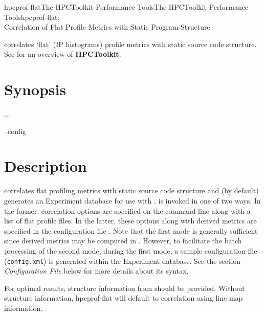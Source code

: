 \documentclass[english]{article}
\begin{document}
\begin{Name}{1}{hpcprof-flat}{The HPCToolkit Performance Tools}{The HPCToolkit Performance Tools}{hpcprof-flat:\\ Correlation of Flat Profile Metrics with Static Program Structure}

 correlates `flat' (IP histograms) profile metrics with static source code structure.  See  for an overview of \textbf{HPCToolkit}.

\end{Name}

\section{Synopsis}

   ...

  --config 

\section{Description}

 correlates flat profiling metrics with static source code structure and (by default) generates an Experiment database for use with .
 is invoked in one of two ways.
In the former, correlation options are specified on the command line along with a list of flat profile files.
In the latter, these options along with derived metrics are specified in the configuration file .
Note that the first mode is generally sufficient since derived metrics may be computed in .
However, to facilitate the batch processing of the second mode, during the first mode, a sample configuration file (\texttt{config.xml}) is generated within the Experiment database.
See the section \emph{Configuration File} below for more details about its syntax.

For optimal results, structure information from  should be provided.
Without structure information, hpcprof-flat will default to correlation using line map information.
\end{document}
